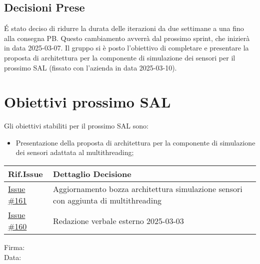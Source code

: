 \documentclass[10pt]{article}
\begin{document}
\subsection{Decisioni Prese}
\'E stato deciso di ridurre la durata delle iterazioni da due settimane a una fino alla consegna PB. Questo cambiamento avverrà dal prossimo sprint, che inizierà in data 2025-03-07. 
Il gruppo si è posto l'obiettivo di completare e presentare la proposta di architettura per la componente di simulazione dei sensori per il prossimo SAL (fissato con 
l'azienda in data 2025-03-10).

\section{Obiettivi prossimo SAL} 
Gli obiettivi stabiliti per il prossimo SAL sono:
    \begin{itemize}
            \item Presentazione della proposta di architettura per la componente di simulazione dei sensori adattata al multithreading;
    \end{itemize}
    \begin{center}
    \begin{tabular}{|>{\centering\arraybackslash}m{3cm}|>{\centering\arraybackslash}m{12cm}|}
	\hline
	\textbf{Rif.Issue} & \textbf{Dettaglio Decisione}\\
	    \hline
            \href{https://github.com/SevenBitsSwe/7BitsDocs/issues/161}{Issue \#161} & Aggiornamento bozza architettura simulazione sensori con aggiunta di multithreading\\
        \hline
            \href{https://github.com/SevenBitsSwe/7BitsDocs/issues/160}{Issue \#160} & Redazione verbale esterno 2025-03-03\\
        \hline
    \end{tabular}
    \end{center}

\vfill
\begin{minipage}{10cm}
Firma: \hrulefill \\
\vspace{2mm}
Data: \dotfill
\end{minipage}
\end{document}

